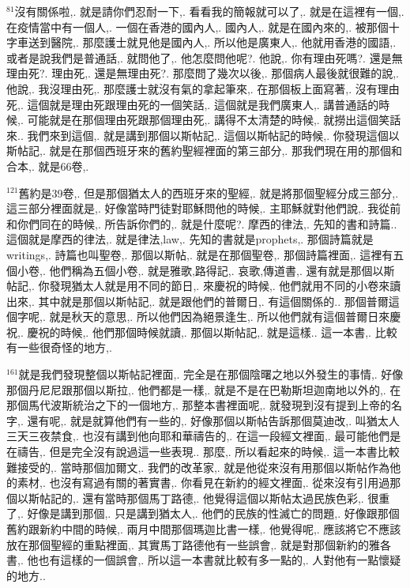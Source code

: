 \documentclass{book}
\begin{document}
$^{81}$沒有關係啦,.
就是請你們忍耐一下,.
看看我的簡報就可以了,.
就是在這裡有一個,.
在疫情當中有一個人,.
一個在香港的國內人,.
國內人,.
就是在國內來的,.
被那個十字車送到醫院,.
那麼護士就見他是國內人,.
所以他是廣東人,.
他就用香港的國語,.
或者是說我們是普通話,.
就問他了,.
他怎麼問他呢?.
他說,.
你有理由死嗎?.
還是無理由死?.
理由死,.
還是無理由死?.
那麼問了幾次以後,.
那個病人最後就很難的說,.
他說,.
我沒理由死,.
那麼護士就沒有氣的拿起筆來,.
在那個板上面寫著,.
沒有理由死,.
這個就是理由死跟理由死的一個笑話,.
這個就是我們廣東人,.
講普通話的時候,.
可能就是在那個理由死跟那個理由死,.
講得不太清楚的時候,.
就撈出這個笑話來..
我們來到這個,.
就是講到那個以斯帖記,.
這個以斯帖記的時候,.
你發現這個以斯帖記,.
就是在那個西班牙來的舊約聖經裡面的第三部分,.
那我們現在用的那個和合本,.
就是66卷,.

$^{121}$舊約是39卷,.
但是那個猶太人的西班牙來的聖經,.
就是將那個聖經分成三部分,.
這三部分裡面就是,.
好像當時門徒對耶穌問他的時候,.
主耶穌就對他們說,.
我從前和你們同在的時候,.
所告訴你們的,.
就是什麼呢?.
摩西的律法,.
先知的書和詩篇..
這個就是摩西的律法,.
就是律法,law,.
先知的書就是prophets,.
那個詩篇就是writings,.
詩篇也叫聖卷,.
那個以斯帖,.
就是在那個聖卷,.
那個詩篇裡面,.
這裡有五個小卷,.
他們稱為五個小卷,.
就是雅歌,路得記,.
哀歌,傳道書,.
還有就是那個以斯帖記,.
你發現猶太人就是用不同的節日,.
來慶祝的時候,.
他們就用不同的小卷來讀出來,.
其中就是那個以斯帖記,.
就是跟他們的普爾日,.
有這個關係的..
那個普爾這個字呢,.
就是秋天的意思,.
所以他們因為絕景逢生,.
所以他們就有這個普爾日來慶祝,.
慶祝的時候,.
他們那個時候就讀,.
那個以斯帖記,.
就是這樣..
這一本書,.
比較有一些很奇怪的地方,.

$^{161}$就是我們發現整個以斯帖記裡面,.
完全是在那個陰曙之地以外發生的事情,.
好像那個丹尼尼跟那個以斯拉,.
他們都是一樣,.
就是不是在巴勒斯坦迦南地以外的,.
在那個馬代波斯統治之下的一個地方,.
那整本書裡面呢,.
就發現到沒有提到上帝的名字,.
還有呢,.
就是就算他們有一些的,.
好像那個以斯帖告訴那個莫迪改,.
叫猶太人三天三夜禁食,.
也沒有講到他向耶和華禱告的,.
在這一段經文裡面,.
最可能他們是在禱告,.
但是完全沒有說過這一些表現..
那麼,.
所以看起來的時候,.
這一本書比較難接受的,.
當時那個加爾文,.
我們的改革家,.
就是他從來沒有用那個以斯帖作為他的素材,.
也沒有寫過有關的著實書,.
你看見在新約的經文裡面,.
從來沒有引用過那個以斯帖記的,.
還有當時那個馬丁路德,.
他覺得這個以斯帖太過民族色彩,.
很重了,.
好像是講到那個,.
只是講到猶太人,.
他們的民族的性滅亡的問題,.
好像跟那個舊約跟新約中間的時候,.
兩月中間那個瑪迦比書一樣,.
他覺得呢,.
應該將它不應該放在那個聖經的重點裡面,.
其實馬丁路德他有一些誤會,.
就是對那個新約的雅各書,.
他也有這樣的一個誤會,.
所以這一本書就比較有多一點的,.
人對他有一點懷疑的地方..
\end{document}
